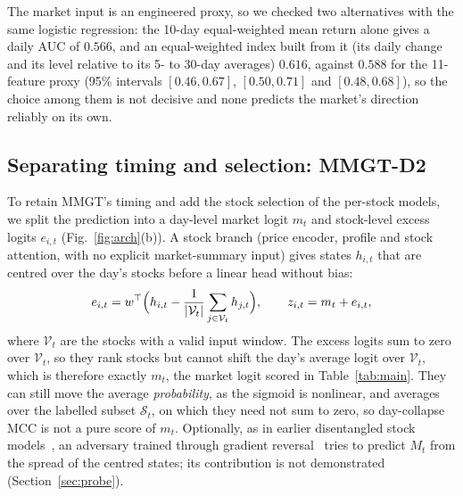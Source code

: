 \documentclass[conference]{IEEEtran}
\begin{document}
The market input is an engineered proxy, so we checked two alternatives with the same
logistic regression: the 10-day equal-weighted mean return alone gives a daily AUC of
$0.566$, and an equal-weighted index built from it (its daily change and its level
relative to its 5- to 30-day averages) $0.616$, against $0.588$ for the 11-feature
proxy (95\% intervals $[0.46, 0.67]$, $[0.50, 0.71]$ and $[0.48, 0.68]$), so the
choice among them is not decisive and none predicts the market's direction reliably
on its own.

\subsection{Separating timing and selection: MMGT-D2}
\label{sec:disent}

To retain MMGT's timing and add the stock selection of the per-stock models, we split
the prediction into a day-level market logit $m_t$ and stock-level excess logits
$e_{i,t}$ (Fig.~\ref{fig:arch}(b)). A stock branch (price encoder, profile and stock attention, with no
explicit market-summary input) gives states $h_{i,t}$ that are centred over the
day's stocks before a linear head without bias:
\begin{equation}
e_{i,t}=w^{\top}\Bigl(h_{i,t}-\frac{1}{|\mathcal{V}_t|}\sum_{j\in\mathcal{V}_t}h_{j,t}\Bigr),
\qquad z_{i,t}=m_t+e_{i,t},
\end{equation}
where $\mathcal{V}_t$ are the stocks with a valid input window. The excess logits sum
to zero over $\mathcal{V}_t$, so they rank stocks but cannot shift the day's average
logit over $\mathcal{V}_t$, which is therefore exactly $m_t$, the market logit scored
in Table~\ref{tab:main}. They can still move the average \emph{probability}, as the
sigmoid is nonlinear, and averages over the labelled subset $\mathcal{S}_t$, on which
they need not sum to zero, so day-collapse MCC is not a pure score of $m_t$.
Optionally, as in earlier disentangled stock models~\cite{tang2020add}, an adversary
trained through gradient reversal~\cite{ganin2015grl} tries to predict $M_t$ from
the spread of the centred states; its contribution is not demonstrated
(Section~\ref{sec:probe}).
\end{document}
